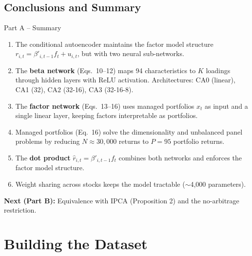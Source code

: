 \documentclass[aspectratio=169]{beamer}
\begin{document}
\subsection{Conclusions and Summary}
%
\begin{frame}{Part A -- Summary}

\begin{enumerate}
    \item The conditional autoencoder maintains the factor model structure $r_{i,t} = \beta'_{i,t-1} f_t + u_{i,t}$, but with two neural sub-networks.
    
    \vspace{0.2em}
    \item The \textcolor{betacolor}{\textbf{beta network}} (Eqs.\ 10--12) maps 94 characteristics to $K$ loadings through hidden layers with ReLU activation. Architectures: CA0 (linear), CA1 (32), CA2 (32-16), CA3 (32-16-8).
    
    \vspace{0.2em}
    \item The \textcolor{factorcolor}{\textbf{factor network}} (Eqs.\ 13--16) uses managed portfolios $x_t$ as input and a single linear layer, keeping factors interpretable as portfolios.
    
    \vspace{0.2em}
    \item Managed portfolios (Eq.\ 16) solve the dimensionality and unbalanced panel problems by reducing $N \approx 30{,}000$ returns to $P = 95$ portfolio returns.
    
    \vspace{0.2em}
    \item The \textcolor{dotcolor}{\textbf{dot product}} $\hat{r}_{i,t} = \beta'_{i,t-1} f_t$ combines both networks and enforces the factor model structure.
    
    \vspace{0.2em}
    \item Weight sharing across stocks keeps the model tractable ($\sim$4,000 parameters).
\end{enumerate}

\vspace{0.3em}
\textbf{Next (Part B):} Equivalence with IPCA (Proposition 2) and the no-arbitrage restriction.
\end{frame}
%
\section{Building the Dataset}
%
%
\end{document}
